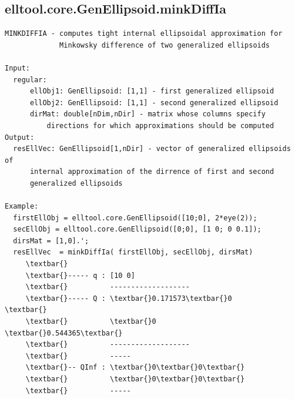 \documentclass[letterpaper,10pt,english]{sphinxmanual}
\begin{document}
\subsection{elltool.core.GenEllipsoid.minkDiffIa}
\label{chap_functions:elltool-core-genellipsoid-minkdiffia}
\begin{Verbatim}[commandchars=\\\{\}]
MINKDIFFIA - computes tight internal ellipsoidal approximation for
             Minkowsky difference of two generalized ellipsoids

Input:
  regular:
      ellObj1: GenEllipsoid: [1,1] - first generalized ellipsoid
      ellObj2: GenEllipsoid: [1,1] - second generalized ellipsoid
      dirMat: double[nDim,nDir] - matrix whose columns specify
          directions for which approximations should be computed
Output:
  resEllVec: GenEllipsoid[1,nDir] - vector of generalized ellipsoids of
      internal approximation of the dirrence of first and second
      generalized ellipsoids

Example:
  firstEllObj = elltool.core.GenEllipsoid([10;0], 2*eye(2));
  secEllObj = elltool.core.GenEllipsoid([0;0], [1 0; 0 0.1]);
  dirsMat = [1,0].';
  resEllVec  = minkDiffIa( firstEllObj, secEllObj, dirsMat)
     \textbar{}
     \textbar{}----- q : [10 0]
     \textbar{}          -------------------
     \textbar{}----- Q : \textbar{}0.171573\textbar{}0       \textbar{}
     \textbar{}          \textbar{}0       \textbar{}0.544365\textbar{}
     \textbar{}          -------------------
     \textbar{}          -----
     \textbar{}-- QInf : \textbar{}0\textbar{}0\textbar{}
     \textbar{}          \textbar{}0\textbar{}0\textbar{}
     \textbar{}          -----
\end{Verbatim}
\end{document}
